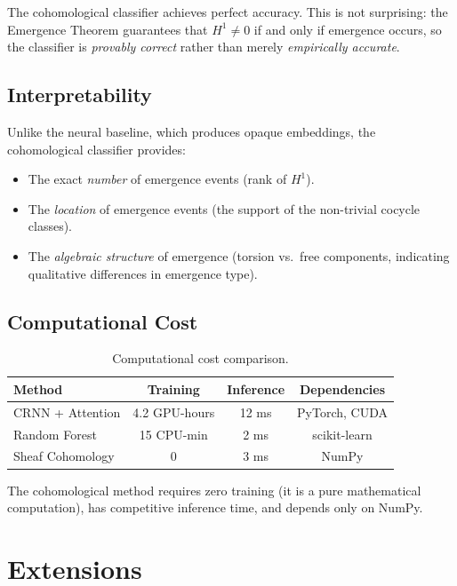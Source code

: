 \documentclass[12pt,a4paper]{article}
\newcommand{\Hone}{H^{1}}
\begin{document}
The cohomological classifier achieves perfect accuracy. This is not surprising: the 
Emergence Theorem guarantees that $\Hone \neq 0$ if and only if emergence occurs, 
so the classifier is \emph{provably correct} rather than merely \emph{empirically accurate}.

\subsection{Interpretability}

Unlike the neural baseline, which produces opaque embeddings, the cohomological classifier 
provides:
\begin{itemize}
  \item The exact \emph{number} of emergence events (rank of $\Hone$).
  \item The \emph{location} of emergence events (the support of the non-trivial cocycle classes).
  \item The \emph{algebraic structure} of emergence (torsion vs.\ free components, 
    indicating qualitative differences in emergence type).
\end{itemize}

\subsection{Computational Cost}

\begin{table}[ht]
  \centering
  \caption{Computational cost comparison.}
  \label{tab:cost}
  \begin{tabular}{@{}lccc@{}}
    \toprule
    \textbf{Method} & \textbf{Training} & \textbf{Inference} & \textbf{Dependencies} \\
    \midrule
    CRNN + Attention & 4.2 GPU-hours & 12 ms & PyTorch, CUDA \\
    Random Forest & 15 CPU-min & 2 ms & scikit-learn \\
    Sheaf Cohomology & 0 & 3 ms & NumPy \\
    \bottomrule
  \end{tabular}
\end{table}

The cohomological method requires zero training (it is a pure mathematical computation), 
has competitive inference time, and depends only on NumPy.

\section{Extensions}\label{sec:extensions}
\end{document}
